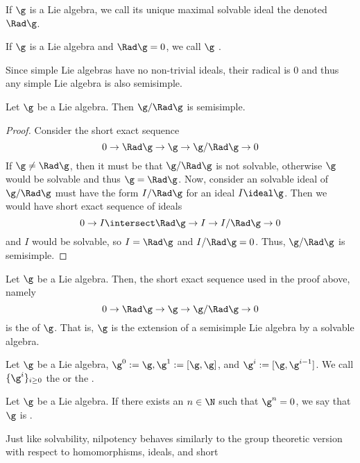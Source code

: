 \documentclass[11pt,leqno,oneside]{amsart}
\numberwithin{thm}{section}
\begin{document}
\begin{defn}
  If \(\g\) is a Lie algebra, we call its unique maximal solvable
  ideal the  denoted \(\Rad \g\). 
\end{defn}
\begin{defn}
  If \(\g\) is a Lie algebra and \(\Rad \g = 0\), we call \(\g\)
  . 
\end{defn}
\begin{rmk}
  Since simple Lie algebras have no non-trivial ideals, their radical
  is \(0\) and thus any simple Lie algebra is also semisimple.
\end{rmk}
\begin{prop}
  Let \(\g\) be a Lie algebra. Then \(\g / \Rad \g\) is semisimple.
\end{prop}
\begin{proof}
  Consider the short exact sequence \[
    0 \to \Rad \g \to \g \to \g / \Rad \g \to 0
  \]
  If \(\g \neq \Rad \g\), then it must be that \(\g / \Rad \g\) is not
  solvable, otherwise \(\g\) would be solvable and thus \(\g = \Rad
  \g\). Now, consider an solvable ideal of \(\g/\Rad \g\) must have
  the form \(I/\Rad \g\) for an ideal \(I \ideal \g\). Then we would
  have short exact sequence of ideals \[
    0 \to I \intersect \Rad \g \to I \to I/\Rad \g \to 0
  \]
  and \(I\) would be solvable, so \(I = \Rad \g\) and \(I/\Rad \g =
  0\). Thus, \(\g / \Rad \g\) is semisimple.
\end{proof}
\begin{defn}\label{levi-decomp}
  Let \(\g\) be a Lie algebra. Then, the short exact sequence used in
  the proof above, namely \[
    0 \to \Rad \g \to \g \to \g/\Rad \g \to 0
  \]
  is the  of \(\g\). That is, \(\g\) is the
  extension of a semisimple Lie algebra by a solvable algebra. 
\end{defn}
\begin{defn}
  Let \(\g\) be a Lie algebra, \(\g^0 := \g, \g^1 := [\g,\g]\), and \(\g^i := [\g, \g^{i-1}]\). We
  call \(\{\g^i\}_{i \geq 0}\) the 
  or the .
\end{defn}
\begin{defn}
  Let \(\g\) be a Lie algebra. If there exists an \(n \in \N\) such
  that \(\g^n = 0\), we say that \(\g\) is .
\end{defn}
Just like solvability, nilpotency behaves similarly to the group
theoretic version with respect to homomorphisms, ideals, and short
\end{document}
